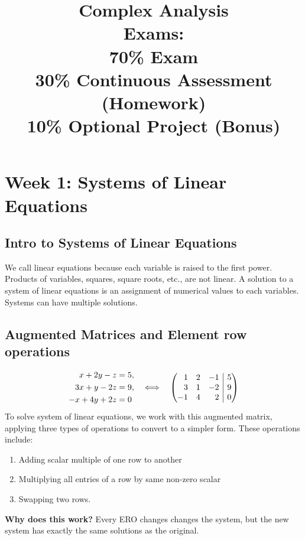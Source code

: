 \documentclass[12pt]{article}
\title{
Complex Analysis\\[2ex]
Exams:\\
70\% Exam\\
30\% Continuous Assessment (Homework) \\
10\% Optional Project (Bonus)\\
}
\author{}     %
\date{}       %
\theoremstyle{definition}
\theoremstyle{plain}
\begin{document}
\maketitle
\pagebreak

\tableofcontents
\pagebreak
\section{Week 1: Systems of Linear Equations}
\subsection{Intro to Systems of Linear Equations}
We call linear equations because each variable is raised to the first power. Products of variables, squares, square roots, etc., are not linear. 
A solution to a system of linear equations is an assignment of numerical values to each variables. Systems can have multiple solutions. 

\subsection{Augmented Matrices and Element row operations} 
\[
\begin{aligned}
x + 2y - z &= 5,\\
3x + y - 2z &= 9,\\
-x + 4y + 2z &= 0
\end{aligned}
\quad
\Longleftrightarrow
\quad 
\left(\begin{array}{@{} r r r | r @{}}
    1 & 2 & -1 & 5 \\
    3 & 1 & -2 & 9 \\
    -1 & 4 & 2 & 0
  \end{array}\right)
\]
To solve system of linear equations, we work with this augmented matrix, 
applying three types of operations to convert to a simpler form. These operations include:
\begin{enumerate}
    \item Adding scalar multiple of one row to another
    \item Multiplying all entries of a row by same non-zero scalar
    \item Swapping two rows. 
\end{enumerate}
\textbf{Why does this work?} Every ERO changes changes the system, but the new system has exactly the same solutions as the original. 
\end{document}
